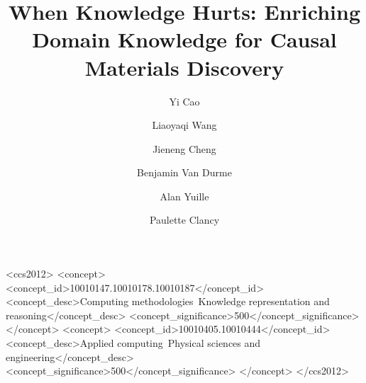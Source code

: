 \documentclass[sigconf,review]{acmart}
\begin{document}
\title{When Knowledge Hurts: Enriching Domain Knowledge for Causal Materials Discovery}

\author{Yi Cao}

\author{Liaoyaqi Wang}

\author{Jieneng Cheng}

\author{Benjamin Van Durme}

\author{Alan Yuille}

\author{Paulette Clancy}



\begin{CCSXML}
<ccs2012>
   <concept>
       <concept_id>10010147.10010178.10010187</concept_id>
       <concept_desc>Computing methodologies~Knowledge representation and reasoning</concept_desc>
       <concept_significance>500</concept_significance>
   </concept>
   <concept>
       <concept_id>10010405.10010444</concept_id>
       <concept_desc>Applied computing~Physical sciences and engineering</concept_desc>
       <concept_significance>500</concept_significance>
   </concept>
</ccs2012>
\end{CCSXML}



\maketitle
\end{document}
